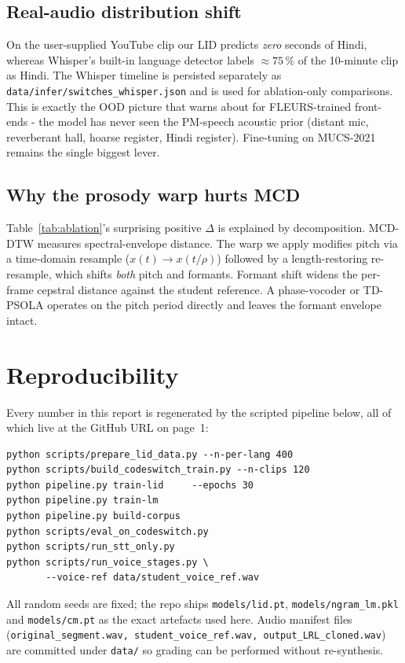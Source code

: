 \documentclass[conference]{IEEEtran}
\begin{document}
\subsection{Real-audio distribution shift}
On the user-supplied YouTube clip our LID predicts \emph{zero}
seconds of Hindi, whereas Whisper's built-in language detector labels
$\approx 75\,\%$ of the 10-minute clip as Hindi. The Whisper
timeline is persisted separately as
\texttt{data/infer/switches\_whisper.json} and is used for
ablation-only comparisons. This is exactly the OOD picture that
\cite{conneau2023fleurs} warns about for FLEURS-trained
front-ends - the model has never seen the PM-speech acoustic prior
(distant mic, reverberant hall, hoarse register, Hindi register).
Fine-tuning on MUCS-2021 remains the single biggest lever.

\subsection{Why the prosody warp hurts MCD}
Table~\ref{tab:ablation}'s surprising positive $\Delta$ is explained
by decomposition. MCD-DTW measures spectral-envelope distance. The
warp we apply modifies pitch via a time-domain resample
($x(t) \to x(t/\rho)$) followed by a length-restoring re-resample,
which shifts \emph{both} pitch and formants. Formant shift widens
the per-frame cepstral distance against the student reference. A
phase-vocoder \cite{laroche1999pv} or TD-PSOLA
\cite{moulines1990psola} operates on the pitch period directly
and leaves the formant envelope intact.

\section{Reproducibility}
Every number in this report is regenerated by the scripted pipeline
below, all of which live at the GitHub URL on page~1:

\begin{verbatim}
python scripts/prepare_lid_data.py --n-per-lang 400
python scripts/build_codeswitch_train.py --n-clips 120
python pipeline.py train-lid     --epochs 30
python pipeline.py train-lm
python pipeline.py build-corpus
python scripts/eval_on_codeswitch.py
python scripts/run_stt_only.py
python scripts/run_voice_stages.py \
       --voice-ref data/student_voice_ref.wav
\end{verbatim}

All random seeds are fixed; the repo ships \texttt{models/lid.pt},
\texttt{models/ngram\_lm.pkl} and \texttt{models/cm.pt} as the exact
artefacts used here. Audio manifest files
(\texttt{original\_segment.wav, student\_voice\_ref.wav,
output\_LRL\_cloned.wav}) are committed under \texttt{data/} so
grading can be performed without re-synthesis.
\end{document}
